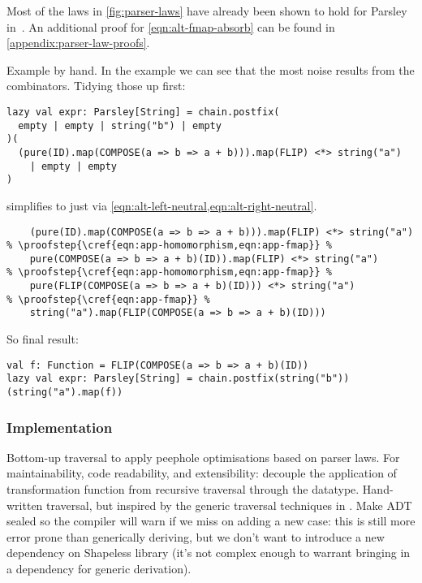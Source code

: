 \documentclass[../../main.tex]{subfiles}
\begin{document}
Most of the laws in \cref{fig:parser-laws} have already been shown to hold for Parsley in~\cite{willis_garnishing_2018}.
An additional proof for \cref{eqn:alt-fmap-absorb} can be found in \cref{appendix:parser-law-proofs}.

Example by hand.
In the example we can see that the most noise results from the  combinators. %
Tidying those up first:
\begin{verbatim}
lazy val expr: Parsley[String] = chain.postfix(
  empty | empty | string("b") | empty
)(
  (pure(ID).map(COMPOSE(a => b => a + b))).map(FLIP) <*> string("a")
    | empty | empty
)
\end{verbatim}
%
 simplifies to just  via \cref{eqn:alt-left-neutral,eqn:alt-right-neutral}.
\begin{verbatim}
    (pure(ID).map(COMPOSE(a => b => a + b))).map(FLIP) <*> string("a")
% \proofstep{\cref{eqn:app-homomorphism,eqn:app-fmap}} %
    pure(COMPOSE(a => b => a + b)(ID)).map(FLIP) <*> string("a")
% \proofstep{\cref{eqn:app-homomorphism,eqn:app-fmap}} %
    pure(FLIP(COMPOSE(a => b => a + b)(ID))) <*> string("a")
% \proofstep{\cref{eqn:app-fmap}} %
    string("a").map(FLIP(COMPOSE(a => b => a + b)(ID)))
\end{verbatim}
So final result:
\begin{verbatim}
val f: Function = FLIP(COMPOSE(a => b => a + b)(ID))
lazy val expr: Parsley[String] = chain.postfix(string("b"))(string("a").map(f))
\end{verbatim}

\subsubsection{Implementation}
Bottom-up traversal to apply peephole optimisations based on parser laws.
For maintainability, code readability, and extensibility: decouple the application of transformation function from recursive traversal through the datatype.
Hand-written traversal, but inspired by the generic traversal techniques in \cite{mitchell_uniform_2007}.
Make ADT sealed so the compiler will warn if we miss on adding a new case: this is still more error prone than generically deriving, but we don't want to introduce a new dependency on Shapeless library (it's not complex enough to warrant bringing in a dependency for generic derivation).
\end{document}
